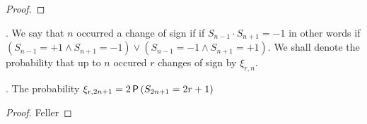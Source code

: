 \begin{proof}
\end{proof}
\begin{defn}
  \Lrw. We say that \intime $n$ occurred a change of sign if if $S_{n-1}\cdot S_{n+1}=-1$ in other words if $\left(S_{n-1}=+1 \land S_{n+1}=-1\right) \lor \left(S_{n-1}=-1 \land S_{n+1}=+1\right).$
  We shall denote the probability that up to \Time $n$ occured $r$ changes of sign by $\xi_{r, n}$.
\end{defn}
\begin{thm}
  \Lrws. The probability $\xi_{r,2n+1}=2\operatorname{\textsf{P}}\left( S_{2n+1}=2r+1 \right)$
\end{thm}
\begin{proof}
  Feller
\end{proof}
